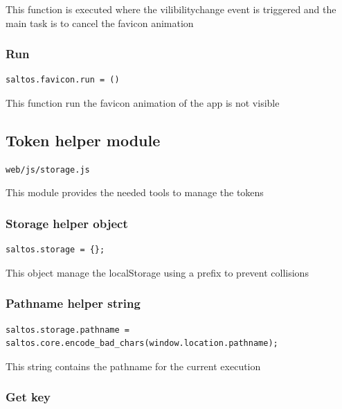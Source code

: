\documentclass[a4paper]{article}
\begin{document}
This function is executed where the vilibilitychange event is triggered and
the main task is to cancel the favicon animation

\hypertarget{toc287}{}
\subsubsection{Run}

\begin{lstlisting}
saltos.favicon.run = ()
\end{lstlisting}

This function run the favicon animation of the app is not visible

\hypertarget{toc288}{}
\subsection{Token helper module}

\begin{lstlisting}
web/js/storage.js
\end{lstlisting}

This module provides the needed tools to manage the tokens

\hypertarget{toc289}{}
\subsubsection{Storage helper object}

\begin{lstlisting}
saltos.storage = {};
\end{lstlisting}

This object manage the localStorage using a prefix to prevent collisions

\hypertarget{toc290}{}
\subsubsection{Pathname helper string}

\begin{lstlisting}
saltos.storage.pathname = saltos.core.encode_bad_chars(window.location.pathname);
\end{lstlisting}

This string contains the pathname for the current execution

\hypertarget{toc291}{}
\subsubsection{Get key}
\end{document}
